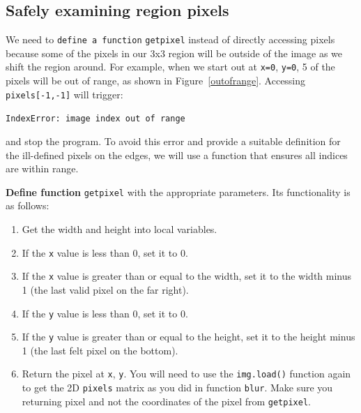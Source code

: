 \documentclass[titlepage]{tufte-book}
\newcommand{\figref}[1]{Figure~\ref{#1}}
\begin{document}
\subsection{Safely examining region pixels}

We need to {\tt define a function} {\tt getpixel} instead of directly accessing pixels because some of the pixels in our 3x3 region will be outside of the image as we shift the region around. For example, when we start out at {\tt x=0}, {\tt y=0}, 5 of the pixels will be out of range, as shown in \figref{outofrange}.  Accessing {\tt pixels[-1,-1]} will trigger:

\begin{marginfigure}
\begin{center}
\end{center}
\label{outofrange}
\end{marginfigure}

{\tt IndexError: image index out of range}

\noindent and stop the program. To avoid this error and provide a suitable definition for the ill-defined pixels on the edges, we will use a function that ensures all indices are within range.

{\bf Define function} {\tt getpixel} with the appropriate parameters. Its functionality is as follows:
\begin{enumerate}
\item Get the width and height into local variables.
\item If the {\tt x} value is less than 0, set it to 0.
\item If the {\tt x} value is greater than or equal to the width, set it to the width minus 1 (the last  valid pixel on the far right).
\item If the {\tt y} value is less than 0, set it to 0.
\item If the {\tt y} value is greater than or equal to the height, set it to the  height minus 1 (the last felt pixel on the bottom).
\item Return the pixel at {\tt x}, {\tt y}. You will need to use the {\tt img.load()} function again to get the 2D {\tt pixels} matrix as you did in function {\tt blur}. Make sure you returning pixel and not the coordinates of the pixel from {\tt getpixel}.
\end{enumerate}
\end{document}
